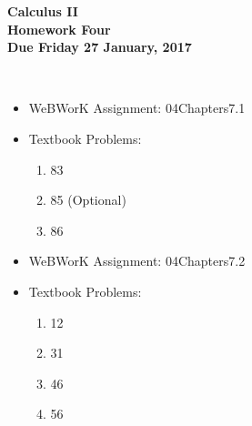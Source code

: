 \documentclass[12pt]{article}
\begin{document}
\pagestyle{empty}
 
\begin{center}
{\large {\bf Calculus II}}\\
\medskip
{\large {\bf Homework Four}}\\
\medskip
{ {\bf Due Friday 27 January, 2017}}\\
\end{center}

 \\ 


\begin{itemize}
\setlength{\itemsep}{0mm}
\item WeBWorK Assignment: 04Chapters7.1
\item Textbook Problems:
  \begin{enumerate}
  \setlength{\itemsep}{-1mm}
    \item 83
    \item 85 (Optional)
    \item 86
  \end{enumerate}
\end{itemize}

\begin{itemize}
\setlength{\itemsep}{0mm}
\item WeBWorK Assignment: 04Chapters7.2
\item Textbook Problems:
  \begin{enumerate}
  \setlength{\itemsep}{-1mm}
    \item 12
    \item 31
    \item 46
    \item 56
  \end{enumerate}
\end{itemize}
\end{document}
